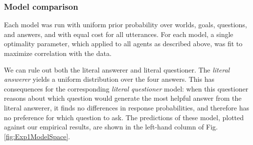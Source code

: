 \documentclass[12pt, floatsintext, man]{apa6}
\begin{document}
\subsubsection{Model comparison}
Each model was run with uniform prior probability over worlds, goals, questions, and answers, and with equal cost for all utterances. For each model, a single optimality parameter, which applied to all agents as described above, was fit to maximize correlation with the data.

We can rule out both the literal answerer and literal questioner. The \emph{literal answerer} yields a uniform distribution over the four answers. %
This has consequences for the corresponding \emph{literal questioner} model: when this questioner reasons about which question would generate the most helpful answer from the literal answerer, it finds no differences in response probabilities, and therefore has no preference for which question to ask. The predictions of these model, plotted against our empirical results, are shown in the left-hand column of Fig. \ref{fig:Exp1ModelSpace}.
\end{document}
